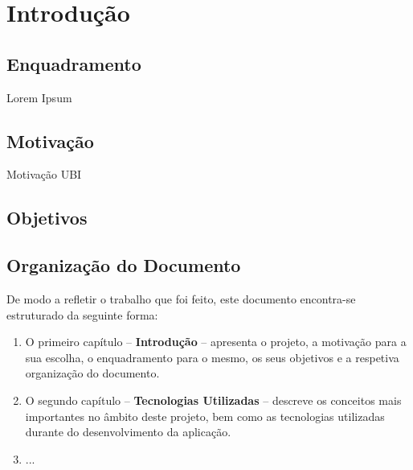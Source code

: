 \chapter{Introdução}
\label{chap:intro}

\section{Enquadramento}
\label{sec:amb} %

Lorem Ipsum

\section{Motivação}
Motivação \ac{UBI} 
\label{sec:mot}

\section{Objetivos}
\label{sec:obj}

\section{Organização do Documento}
\label{sec:organ}
De modo a refletir o trabalho que foi feito, este documento encontra-se estruturado da seguinte forma:
\begin{enumerate}
\item O primeiro capítulo -- \textbf{Introdução} -- apresenta o projeto, a motivação para a sua escolha, o enquadramento para o mesmo, os seus objetivos e a respetiva organização do documento.
\item O segundo capítulo -- \textbf{Tecnologias Utilizadas} -- descreve os conceitos mais importantes no âmbito deste projeto, bem como as tecnologias utilizadas durante do desenvolvimento da aplicação.
\item ...
\end{enumerate}
